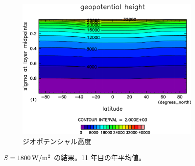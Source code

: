 \documentclass[body]{subfiles}
\begin{document}
\begin{figure}[t]
\begin{subfigure}{.4\textwidth}
		\includegraphics[width=\columnwidth]{S1800/Height,time=3650:4015-crop-rotate.pdf}
		\caption{ジオポテンシャル高度}
	\end{subfigure}
	\caption{
		\(S=1800\hmu{W/m^2}\) の結果。11 年目の年平均値。
	}\label{S1800}
\end{figure}
\end{document}
